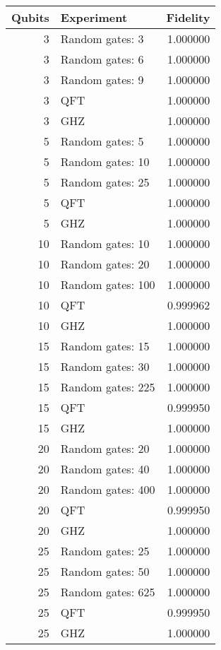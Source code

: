 \begin{table}[H]
\begin{tabular}{rlr}
\toprule
Qubits & Experiment & Fidelity \\
\midrule
3 & Random gates: 3 & 1.000000 \\
3 & Random gates: 6 & 1.000000 \\
3 & Random gates: 9 & 1.000000 \\
3 & QFT & 1.000000 \\
3 & GHZ & 1.000000 \\
5 & Random gates: 5 & 1.000000 \\
5 & Random gates: 10 & 1.000000 \\
5 & Random gates: 25 & 1.000000 \\
5 & QFT & 1.000000 \\
5 & GHZ & 1.000000 \\
10 & Random gates: 10 & 1.000000 \\
10 & Random gates: 20 & 1.000000 \\
10 & Random gates: 100 & 1.000000 \\
10 & QFT & 0.999962 \\
10 & GHZ & 1.000000 \\
15 & Random gates: 15 & 1.000000 \\
15 & Random gates: 30 & 1.000000 \\
15 & Random gates: 225 & 1.000000 \\
15 & QFT & 0.999950 \\
15 & GHZ & 1.000000 \\
20 & Random gates: 20 & 1.000000 \\
20 & Random gates: 40 & 1.000000 \\
20 & Random gates: 400 & 1.000000 \\
20 & QFT & 0.999950 \\
20 & GHZ & 1.000000 \\
25 & Random gates: 25 & 1.000000 \\
25 & Random gates: 50 & 1.000000 \\
25 & Random gates: 625 & 1.000000 \\
25 & QFT & 0.999950 \\
25 & GHZ & 1.000000 \\
\bottomrule
\end{tabular}
\end{table}
